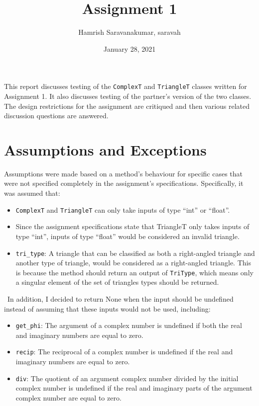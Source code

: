 \documentclass[12pt]{article}
\title{Assignment 1}
\author{Hamrish Saravanakumar, saravah}
\date{January 28, 2021}
\begin{document}
\maketitle

This report discusses testing of the \verb|ComplexT| and \verb|TriangleT|
classes written for Assignment 1. It also discusses testing of the partner's
version of the two classes. The design restrictions for the assignment
are critiqued and then various related discussion questions are answered.

\section{Assumptions and Exceptions} \label{AssumptAndExcept}

\noindent Assumptions were made based on a method’s behaviour for specific cases that were not specified completely in the assignment’s specifications. Specifically, it was assumed that:
\begin{itemize}
	\item \verb |ComplexT| and \verb |TriangleT| can only take inputs of type “int” or “float”.
	\item Since the assignment specifications state that TriangleT only takes inputs of type “int”,  inputs of type “float” would be considered an invalid triangle.
	\item \verb |tri_type|: A triangle that can be classified as both a right-angled triangle and another type of triangle, would be considered as a right-angled triangle. This is because the method should return an output of \verb |TriType|, which means only a singular element of the set of triangles types should be returned. 
\end{itemize}

~\newline\noindent In addition, I decided to return None when the input should be undefined instead of assuming that these inputs would not be used, including:
\begin{itemize}
	\item \verb |get_phi|: The argument of a complex number is undefined if both the real and imaginary numbers are equal to zero.
	\item \verb |recip|: The reciprocal of a complex number is undefined if the real and imaginary numbers are equal to zero.
	\item \verb |div|: The quotient of an argument complex number divided by the initial complex number is undefined if the real and imaginary parts of the argument complex number are equal to zero.
\end{itemize}
\end{document}
